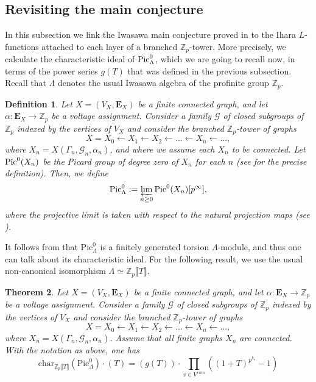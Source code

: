 \documentclass[11pt]{amsart}
\newtheorem{theorem}{Theorem}[section]
\newtheorem{definition}[theorem]{Definition}
\numberwithin{equation}{section}
\theoremstyle{remark}
\theoremstyle{definition}
\begin{document}
\subsection{Revisiting the main conjecture} \label{section:revi}

In this subsection we link the Iwasawa main conjecture proved in \cite[\S 5.2]{Gambheera/Vallieres:2024} to the Ihara $L$-functions attached to each layer of a branched $\mathbb{Z}_{p}$-tower. More precisely, we calculate the characteristic ideal of ${\rm Pic}^{0}_{\Lambda}$, which we are going to recall now, in terms of the power series $g(T)$ that was defined in the previous subsection.  Recall that $\Lambda$ denotes the usual Iwasawa algebra of the profinite group $\mathbb{Z}_{p}$. 

\begin{definition}
Let $X = (V_{X},\mathbf{E}_{X})$ be a finite connected graph, and let $\alpha:\mathbf{E}_{X} \rightarrow \mathbb{Z}_{p}$ be a voltage assignment.  Consider a family $\mathcal{G}$ of closed subgroups of $\mathbb{Z}_{p}$ indexed by the vertices of $V_{X}$ and consider the branched $\mathbb{Z}_{p}$-tower of graphs
$$X = X_{0} \leftarrow X_{1} \leftarrow X_{2} \leftarrow \ldots \leftarrow X_{n} \leftarrow \ldots, $$
where $X_{n} = X(\Gamma_{n},\mathcal{G}_{n},\alpha_{n})$, and where we assume each $X_{n}$ to be connected. Let ${\rm Pic}^0(X_n)$ be the Picard group of degree zero of $X_n$ for each $n$ (see \cite[\S 2.2]{Gambheera/Vallieres:2024} for the precise definition). Then, we define
$$\mathrm{Pic}^{0}_{\Lambda} := \varprojlim_{n \ge 0}\mathrm{Pic}^{0}(X_{n})[p^{\infty}],$$
where the projective limit is taken with respect to the natural projection maps (see \cite[\S 4.3]{Gambheera/Vallieres:2024}).
\end{definition}
It follows from \cite[Theorem 5.6]{Gambheera/Vallieres:2024} that $\mathrm{Pic}^{0}_{\Lambda}$ is a finitely generated torsion $\Lambda$-module, and thus one can talk about its characteristic ideal.  For the following result, we use the usual non-canonical isomorphism $\Lambda \simeq \mathbb{Z}_{p}\llbracket T \rrbracket$.
\begin{theorem}\label{main conjecture}
Let $X = (V_{X},\mathbf{E}_{X})$ be a finite connected graph, and let $\alpha:\mathbf{E}_{X} \rightarrow \mathbb{Z}_{p}$ be a voltage assignment.  Consider a family $\mathcal{G}$ of closed subgroups of $\mathbb{Z}_{p}$ indexed by the vertices of $V_{X}$ and consider the branched $\mathbb{Z}_{p}$-tower of graphs
$$X = X_{0} \leftarrow X_{1} \leftarrow X_{2} \leftarrow \ldots \leftarrow X_{n} \leftarrow \ldots,$$
where $X_{n} = X(\Gamma_{n},\mathcal{G}_{n},\alpha_{n})$.  Assume that all finite graphs $X_{n}$ are connected.  With the notation as above, one has
$$\mathrm{char}_{\mathbb{Z}_{p}\llbracket T \rrbracket}(\mathrm{Pic}^0_{\Lambda}) \cdot (T) = (g(T))\cdot \prod_{v\in V^{ram}} ((1+T)^{p^{k_v}}-1)$$
\end{theorem}
\end{document}
